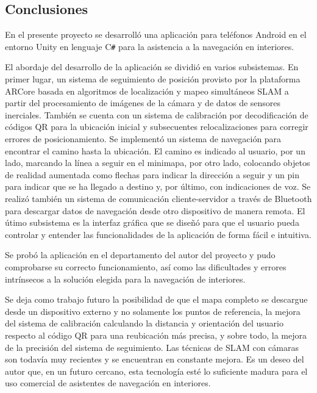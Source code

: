 \documentclass{article}
\newenvironment{standalone}{\begin{preview}}{\end{preview}}
\begin{document}
\begin{standalone}

\section{Conclusiones}

En el presente proyecto se desarrolló una aplicación para teléfonos Android en el entorno Unity en lenguaje C\texttt{\#} para la asistencia a la navegación en interiores.

El abordaje del desarrollo de la aplicación se dividió en varios subsistemas. En primer lugar, un sistema de seguimiento de posición provisto por la plataforma ARCore basada en algoritmos de localización y mapeo simultáneos SLAM a partir del procesamiento de imágenes de la cámara y de datos de sensores inerciales.
También se cuenta con un sistema de calibración por decodificación de códigos QR para la ubicación inicial y subsecuentes relocalizaciones para corregir errores de posicionamiento.
Se implementó un sistema de navegación para encontrar el camino hasta la ubicación.
El camino es indicado al usuario, por un lado, marcando la línea a seguir en el minimapa, por otro lado, colocando objetos de realidad aumentada como flechas para indicar la dirección a seguir y un pin para indicar que se ha llegado a destino y, por último, con indicaciones de voz.
Se realizó también un sistema de comunicación cliente-servidor a través de Bluetooth para descargar datos de navegación desde otro dispositivo de manera remota.
El útimo subsistema es la interfaz gráfica que se diseñó para que el usuario pueda controlar y entender las funcionalidades de la aplicación de forma fácil e intuitiva.

Se probó la aplicación en el departamento del autor del proyecto y pudo comprobarse su correcto funcionamiento, así como las dificultades y errores intrínsecos a la solución elegida para la navegación de interiores.

Se deja como trabajo futuro la posibilidad de que el mapa completo se descargue desde un dispositivo externo y no solamente los puntos de referencia, la mejora del sistema de calibración calculando la distancia y orientación del usuario respecto al código QR para una reubicación más precisa, y sobre todo, la mejora de la precisión del sistema de seguimiento.
Las técnicas de SLAM con cámaras son todavía muy recientes y se encuentran en constante mejora.
Es un deseo del autor que, en un futuro cercano, esta tecnología esté lo suficiente madura para el uso comercial de asistentes de navegación en interiores.

\end{standalone}
\end{document}
